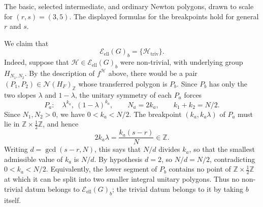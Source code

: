 \documentclass[11pt,a4paper]{article}
\newcommand{\Eell}{\mathcal{E}_{\mathrm{ell}}}
\theoremstyle{definition}
\theoremstyle{plain}
\theoremstyle{remark}
\theoremstyle{plain}
\begin{document}
\begin{center}
\begin{minipage}{0.95\textwidth}
\centering
{}

\small The basic, selected intermediate, and ordinary Newton polygons, drawn to scale for $(r,s)=(3,5)$. The displayed formulas for the breakpoints hold for general $r$ and $s$.
\end{minipage}
\end{center}

We claim that
$$
\Eell(G)_b=\{\mathcal H_{\mathrm{triv}}\}.
$$
Indeed, suppose that $\mathcal H\in\Eell(G)_b$ were non-trivial, with underlying group $H_{N_1,N_2}$. By the description of $f^{\mathcal H}$ above, there would be a pair $(P_1,P_2)\in\mathcal N(H_F)_{\mathbb Z}$ whose transferred polygon is $P_b$. Since $P_b$ has only the two slopes $\lambda$ and $1-\lambda$, the unitary symmetry of each $P_a$ forces
$$
P_a:\quad \lambda^{k_a},\ (1-\lambda)^{k_a},
\qquad N_a=2k_a,
\qquad k_1+k_2=N/2.
$$
Since $N_1,N_2>0$, we have $0<k_a<N/2$. The breakpoint $(k_a,k_a\lambda)$ of $P_a$ must lie in $\mathbb Z\times\frac12\mathbb Z$, and hence
$$
2k_a\lambda=\frac{k_a(s-r)}{N}\in\mathbb Z.
$$
Writing $d=\gcd(s-r,N)$, this says that $N/d$ divides $k_a$, so that the smallest admissible value of $k_a$ is $N/d$. By hypothesis $d=2$, so $N/d=N/2$, contradicting $0<k_a<N/2$. Equivalently, the lower segment of $P_b$ contains no point of $\mathbb Z\times\frac12\mathbb Z$ at which it can be split into two smaller integral unitary polygons. Thus no non-trivial datum belongs to $\Eell(G)_b$; the trivial datum belongs to it by taking $b$ itself.
\end{document}
